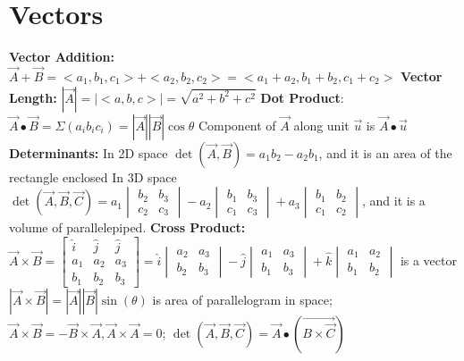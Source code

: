 \documentclass[twoside]{article}
\begin{document}
\section{Vectors}
\textbf{Vector Addition:}
\indent $\vec{A}+\vec{B} = <a_1,b_1,c_1> + <a_2,b_2,c_2> = <a_1+a_2,b_1+b_2,c_1+c_2>$ \newline
\textbf{Vector Length:}
\indent $|\vec{A}| = |<a,b,c>| = \sqrt{a^{2}+b^{2}+c^{2}}$ \newline
\textbf{Dot Product}:\newline
\indent $\vec{A} \bullet \vec{B} = \Sigma(a_{i}b_{i}c_{i})=|\vec{A}||\vec{B}|\cos\theta$ \newline
\indent Component of $\vec{A}$ along unit $\vec{u}$ is $\vec{A} \bullet \vec{u}$ \newline
\textbf{Determinants:} \newline
\indent In 2D space $\det(\vec{A},\vec{B}) = a_1b_2-a_2b_1$, and it is an area of the rectangle enclosed\newline
\indent In 3D space $\det(\vec{A},\vec{B},\vec{C}) = a_1\begin{vmatrix}b_2 & b_3 \\c_2 & c_3\end{vmatrix}-a_2\begin{vmatrix}b_1 & b_3 \\c_1 &c _3\end{vmatrix}+a_3\begin{vmatrix}b_1 & b_2 \\c_1 & c_2\end{vmatrix}$, and it is a volume of parallelepiped.\newline
\textbf{Cross Product:}\newline
\indent $\vec{A}\times\vec{B} = \begin{bmatrix}\hat{i} & \hat{j} & \hat{j} \\a_1 & a_2 & a_3 \\b_1 & b_2 & b_3\end{bmatrix} = \hat{i}\begin{vmatrix}a_2 & a_3 \\ b_2 & b_3\end{vmatrix} - \hat{j}\begin{vmatrix}a_1 & a_3 \\ b_1 & b_3\end{vmatrix} + \hat{k}\begin{vmatrix}a_1 & a_2\\ b_1 & b_2\end{vmatrix}$ is a vector \newline
\indent $|\vec{A}\times\vec{B}| = |\vec{A}||\vec{B}|\sin(\theta)$ is area of parallelogram in space; $\vec{A}\times\vec{B} = -\vec{B}\times\vec{A}, \vec{A}\times\vec{A}=0$; $\det(\vec{A},\vec{B},\vec{C}) = \vec{A}\bullet(\vec{B\times\vec{C}})$
\end{document}
